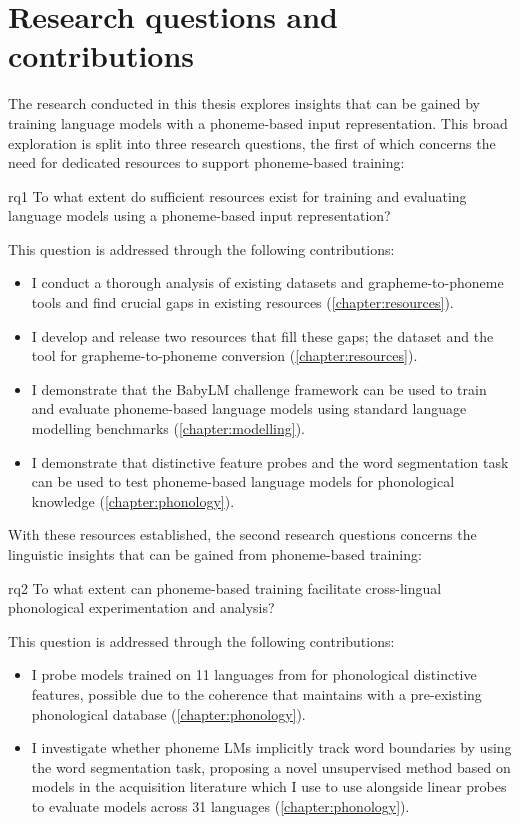 \section{Research questions and contributions}

The research conducted in this thesis explores insights that can be gained by training language models with a phoneme-based input representation. This broad exploration is split into three research questions, the first of which concerns the need for dedicated resources to support phoneme-based training:

\begin{question}{}{rq1}
    To what extent do sufficient resources exist for training and evaluating language models using a phoneme-based input representation?
\end{question}

This question is addressed through the following contributions:

\begin{itemize}
    \item I conduct a thorough analysis of existing datasets and grapheme-to-phoneme tools and find crucial gaps in existing resources (\cref{chapter:resources}).
    \item I develop and release two resources that fill these gaps; the \ipachildes dataset and the \gpp tool for grapheme-to-phoneme conversion (\cref{chapter:resources}).
    \item I demonstrate that the BabyLM challenge framework can be used to train and evaluate phoneme-based language models using standard language modelling benchmarks (\cref{chapter:modelling}).
    \item I demonstrate that distinctive feature probes and the word segmentation task can be used to test phoneme-based language models for phonological knowledge (\cref{chapter:phonology}).
\end{itemize}

With these resources established, the second research questions concerns the linguistic insights that can be gained from phoneme-based training:

\begin{question}{}{rq2}
    To what extent can phoneme-based training facilitate cross-lingual phonological experimentation and analysis?
\end{question}

This question is addressed through the following contributions:

\begin{itemize}
    \item I probe models trained on 11 languages from \ipachildes for phonological distinctive features, possible due to the coherence that \gpp maintains with a pre-existing phonological database (\cref{chapter:phonology}).
    \item I investigate whether phoneme LMs implicitly track word boundaries by using the word segmentation task, proposing a novel unsupervised method based on models in the acquisition literature which I use to use alongside linear probes to evaluate models across 31 languages (\cref{chapter:phonology}).
\end{itemize}

